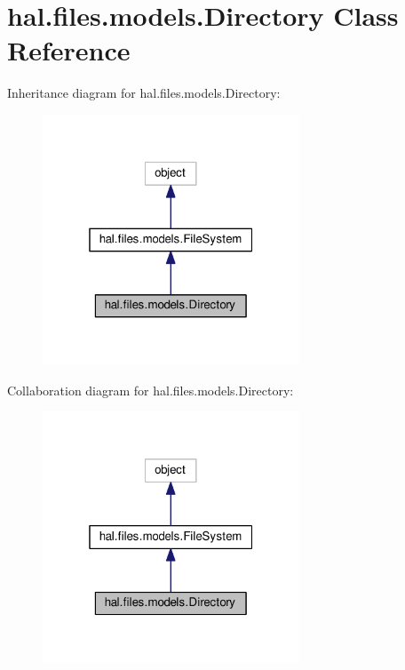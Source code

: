 \hypertarget{classhal_1_1files_1_1models_1_1_directory}{}\section{hal.\+files.\+models.\+Directory Class Reference}
\label{classhal_1_1files_1_1models_1_1_directory}


Inheritance diagram for hal.\+files.\+models.\+Directory\+:
\nopagebreak
\begin{figure}[H]
\begin{center}
\leavevmode
\includegraphics[width=217pt]{classhal_1_1files_1_1models_1_1_directory__inherit__graph}
\end{center}
\end{figure}


Collaboration diagram for hal.\+files.\+models.\+Directory\+:
\nopagebreak
\begin{figure}[H]
\begin{center}
\leavevmode
\includegraphics[width=217pt]{classhal_1_1files_1_1models_1_1_directory__coll__graph}
\end{center}
\end{figure}
